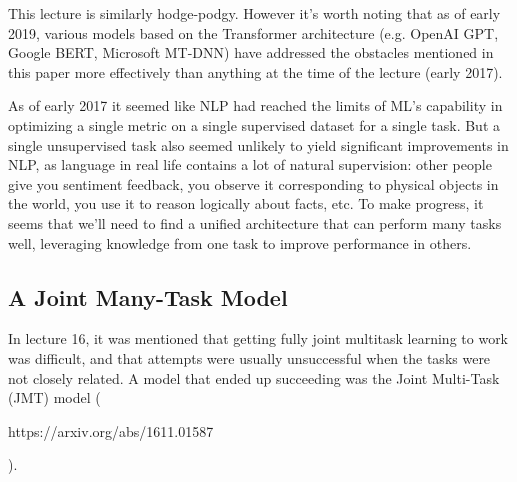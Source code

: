 This lecture is similarly hodge-podgy. However it's worth noting that as of early 2019, various models based on the Transformer architecture (e.g. OpenAI GPT, Google BERT, Microsoft MT-DNN) have addressed the obstacles mentioned in this paper more effectively than anything at the time of the lecture (early 2017).

As of early 2017 it seemed like NLP had reached the limits of ML's capability in optimizing a single metric on a single supervised dataset for a single task. But a single unsupervised task also seemed unlikely to yield significant improvements in NLP, as language in real life contains a lot of natural supervision: other people give you sentiment feedback, you observe it corresponding to physical objects in the world, you use it to reason logically about facts, etc. To make progress, it seems that we'll need to find a unified architecture that can perform many tasks well, leveraging knowledge from one task to improve performance in others.

\subsection{A Joint Many-Task Model}
In lecture 16, it was mentioned that getting fully joint multitask learning to work was difficult, and that attempts were usually unsuccessful when the tasks were not closely related. A model that ended up succeeding was the Joint Multi-Task (JMT) model (\begin{tt}https://arxiv.org/abs/1611.01587\end{tt}).

